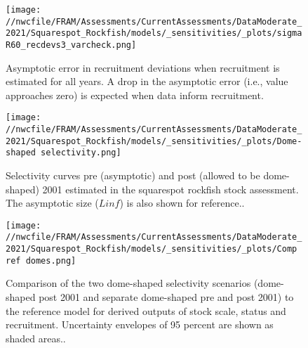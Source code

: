 \documentclass[11pt,
  english,
  a4paper,
]{article}
\begin{document}
\tagmcend\tagstructend


\begin{figure}
\centering
\texttt{[image: //nwcfile/FRAM/Assessments/CurrentAssessments/DataModerate\_2021/Squarespot\_Rockfish/models/\_sensitivities/\_plots/sigmaR60\_recdevs3\_varcheck.png]}
\caption{Asymptotic error in recruitment deviations when recruitment is estimated for all years. A drop in the asymptotic error (i.e., value approaches zero) is expected when data inform recruitment.\label{fig:rec-mod-var}}
\end{figure}

\tagmcend\tagstructend


\begin{figure}
\centering
\texttt{[image: //nwcfile/FRAM/Assessments/CurrentAssessments/DataModerate\_2021/Squarespot\_Rockfish/models/\_sensitivities/\_plots/Dome-shaped selectivity.png]}
\caption{Selectivity curves pre (asymptotic) and post (allowed to be dome-shaped) 2001 estimated in the squarespot rockfish stock assessment. The asymptotic size ({\(Linf\)\leavevmode\tagmcend\tagstructend}) is also shown for reference..\label{fig:dome-shaped}}
\end{figure}

\tagmcend\tagstructend


\begin{figure}
\centering
\texttt{[image: //nwcfile/FRAM/Assessments/CurrentAssessments/DataModerate\_2021/Squarespot\_Rockfish/models/\_sensitivities/\_plots/Comp ref domes.png]}
\caption{Comparison of the two dome-shaped selectivity scenarios (dome-shaped post 2001 and separate dome-shaped pre and post 2001) to the reference model for derived outputs of stock scale, status and recruitment. Uncertainty envelopes of 95 percent are shown as shaded areas..\label{fig:Comp-ref-domes}}
\end{figure}
\end{document}
